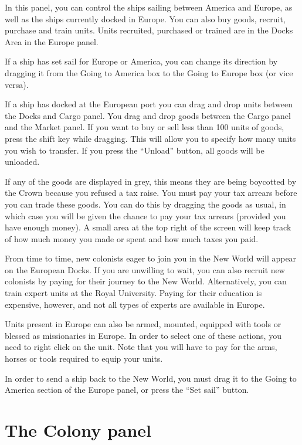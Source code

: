 \documentclass[12pt]{book}
\begin{document}
In this panel, you can control the ships sailing between America and
Europe, as well as the ships currently docked in Europe. You can also
buy goods, recruit, purchase and train units. Units recruited,
purchased or trained are in the Docks Area in the Europe panel.

If a ship has set sail for Europe or America, you can change its
direction by dragging it from the Going to America box to the Going
to Europe box (or vice versa).

If a ship has docked at the European port you can drag and drop units
between the Docks and Cargo panel. You drag and drop goods between the
Cargo panel and the Market panel. If you want to buy or sell less than
100 units of goods, press the shift key while dragging. This will
allow you to specify how many units you wish to transfer. If you press
the ``Unload'' button, all goods will be unloaded.

If any of the goods are displayed in grey, this means they are being
boycotted by the Crown because you refused a tax raise. You must pay
your tax arrears before you can trade these goods. You can do this by
dragging the goods as usual, in which case you will be given the
chance to pay your tax arrears (provided you have enough money). A
small area at the top right of the screen will keep track of how much
money you made or spent and how much taxes you paid.

From time to time, new colonists eager to join you in the New World
will appear on the European Docks. If you are unwilling to wait, you
can also recruit new colonists by paying for their journey to the New
World. Alternatively, you can train expert units at the Royal
University. Paying for their education is expensive, however, and not
all types of experts are available in Europe.

Units present in Europe can also be armed, mounted, equipped with
tools or blessed as missionaries in Europe. In order to select one of
these actions, you need to right click on the unit. Note that you will
have to pay for the arms, horses or tools required to equip your
units.

In order to send a ship back to the New World, you must drag it to the
Going to America section of the Europe panel, or press the ``Set
sail'' button.


\hypertarget{colony panel}{\section{The Colony panel}}
\end{document}

